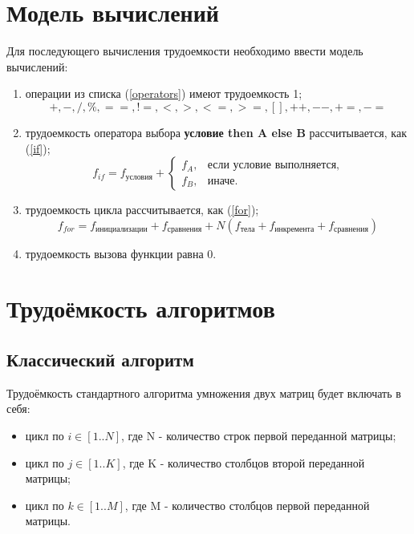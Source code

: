 \documentclass[12pt]{report}
\begin{document}
\newpage
\section{Модель вычислений}

Для последующего вычисления трудоемкости необходимо ввести модель вычислений:
\begin{enumerate}
    \item операции из списка (\ref{operators}) имеют трудоемкость 1;
        \begin{equation}
            \label{operators}
            +, -, /, \%, ==, !=, <, >, <=, >=, [], ++, {-}-, +=, -=
        \end{equation}
    \item трудоемкость оператора выбора \textbf{условие then A else B} рассчитывается, как (\ref{if});
	\begin{equation}
        \label{if}
        f_{if} = f_{\text{условия}} +
        \begin{cases}
        f_A, & \text{если условие выполняется,}\\
        f_B, & \text{иначе.}
        \end{cases}
	\end{equation}
\item трудоемкость цикла рассчитывается, как (\ref{for});
    \begin{equation}
        \label{for:for}
        f_{for} = f_{\text{инициализации}} + f_{\text{сравнения}} + N(f_{\text{тела}} + f_{\text{инкремента}} + f_{\text{сравнения}})
    \end{equation}
	\item трудоемкость вызова функции равна 0.
\end{enumerate}

\section{Трудоёмкость алгоритмов}
\subsection{Классический алгоритм}
Трудоёмкость стандартного алгоритма умножения двух матриц будет включать в себя:
\begin{itemize}
\item цикл по $i \in [1..N]$, где N - количество строк первой переданной матрицы;
\item цикл по $j \in [1..K]$, где K - количество столбцов второй переданной матрицы;
\item цикл по $k \in [1..M]$, где M - количество столбцов первой переданной матрицы.
\end{itemize}
\end{document}
